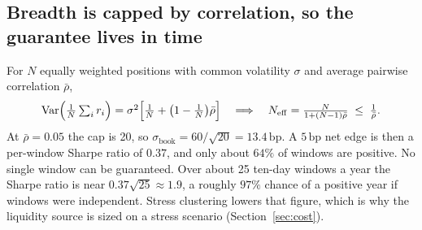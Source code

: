 \documentclass[11pt,letterpaper]{article}
\newcommand{\bp}{\,\mathrm{bp}}
\newcommand{\Neff}{N_{\mathrm{eff}}}
\begin{document}
\subsection{Breadth is capped by correlation, so the guarantee lives in time}
For $N$ equally weighted positions with common volatility $\sigma$ and average pairwise correlation $\bar\rho$,
\begin{equation}
\mathrm{Var}\Bigl(\tfrac1N\textstyle\sum_i r_i\Bigr)=\sigma^2\Bigl[\tfrac1N+\bigl(1-\tfrac1N\bigr)\bar\rho\Bigr]
\quad\Longrightarrow\quad
\Neff=\frac{N}{1+(N-1)\bar\rho}\;\le\;\frac{1}{\bar\rho}.
\label{eq:neff}
\end{equation}
At $\bar\rho=0.05$ the cap is 20, so $\sigma_{\mathrm{book}}=60/\sqrt{20}=13.4\bp$. A $5\bp$ net edge is then a per-window Sharpe ratio of $0.37$, and only about $64\%$ of windows are positive. No single window can be guaranteed. Over about 25 ten-day windows a year the Sharpe ratio is near $0.37\sqrt{25}\approx1.9$, a roughly $97\%$ chance of a positive year if windows were independent. Stress clustering lowers that figure, which is why the liquidity source is sized on a stress scenario (Section~\ref{sec:cost}).
\end{document}
